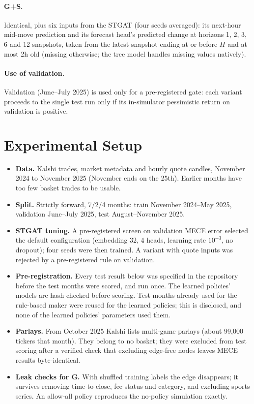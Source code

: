 \documentclass[11pt,a4paper]{article}
\begin{document}
\paragraph{G+S.} Identical, plus six inputs from the STGAT (four seeds averaged): its next-hour mid-move prediction and
its forecast head's predicted change at horizons 1, 2, 3, 6 and 12 snapshots, taken from the latest snapshot ending at
or before $H$ and at most 2h old (missing otherwise; the tree model handles missing values natively).

\paragraph{Use of validation.} Validation (June--July 2025) is used only for a pre-registered gate: each variant proceeds
to the single test run only if its in-simulator pessimistic return on validation is positive.

\section{Experimental Setup}

\begin{itemize}
  \item \textbf{Data.} Kalshi trades, market metadata and hourly quote candles, November 2024 to November 2025
    (November ends on the 25th). Earlier months have too few basket trades to be usable.
  \item \textbf{Split.} Strictly forward, 7/2/4 months: train November 2024--May 2025, validation June--July 2025,
    test August--November 2025.
  \item \textbf{STGAT tuning.} A pre-registered screen on validation MECE error selected the default configuration
    (embedding 32, 4 heads, learning rate $10^{-3}$, no dropout); four seeds were then trained. A variant with quote
    inputs was rejected by a pre-registered rule on validation.
  \item \textbf{Pre-registration.} Every test result below was specified in the repository before the test months
    were scored, and run once. The learned policies' models are hash-checked before scoring. Test months already
    used for the rule-based maker were reused for the learned policies; this is disclosed, and none of the learned
    policies' parameters used them.
  \item \textbf{Parlays.} From October 2025 Kalshi lists multi-game parlays (about 99{,}000 tickers that month).
    They belong to no basket; they were excluded from test scoring after a verified check that excluding edge-free
    nodes leaves MECE results byte-identical.
  \item \textbf{Leak checks for G.} With shuffled training labels the edge disappears; it survives removing
    time-to-close, fee status and category, and excluding sports series. An allow-all policy reproduces the
    no-policy simulation exactly.
\end{itemize}
\end{document}
